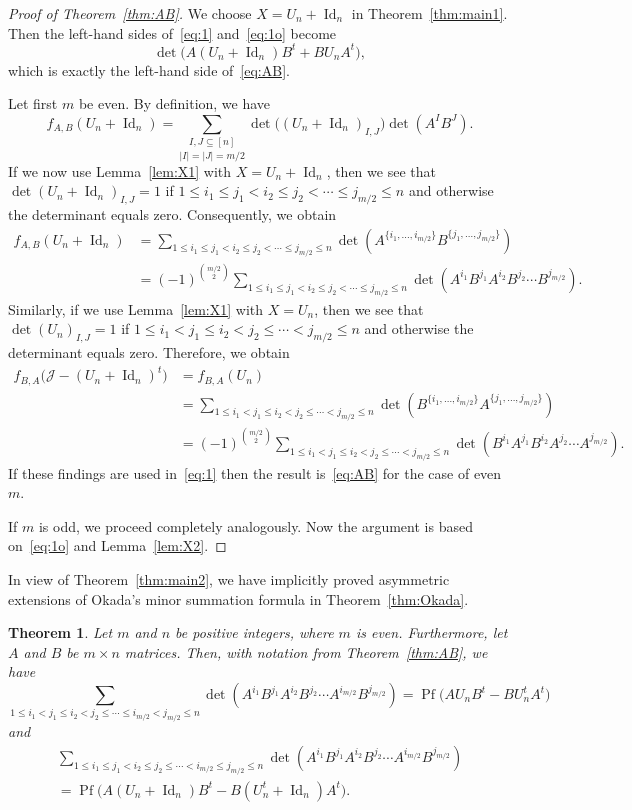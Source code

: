 \documentclass[12pt,reqno]{amsart}
\numberwithin{equation}{section}
\newtheorem{theorem}{Theorem}
\theoremstyle{definition}
\theoremstyle{remark}
\def\Pf{\operatorname{Pf}}
\def\Id{\operatorname{Id}}
\def\J{\mathcal J}
\begin{document}
\begin{proof}[Proof of Theorem~\ref{thm:AB}]
We choose $X=U_n+\Id_n$ in Theorem~\ref{thm:main1}.
Then the left-hand sides of~\eqref{eq:1} and~\eqref{eq:1o} become
$$
\det\bigl(A(U_n+\Id_n)B^t+BU_nA^t\bigr),
$$
which is exactly the left-hand side of~\eqref{eq:AB}.

Let first $m$ be even.
By definition, we have
$$
f_{A,B}(U_n+\Id_n)=\underset {|I|=|J|=m/2}{\sum_{I,J\subseteq[n]}}
\det \bigl((U_n+\Id_n)_{I,J}\bigr) \det(A^IB^J).
$$
If we now use Lemma~\ref{lem:X1} with $X=U_n+\Id_n$, then we
see that $\det (U_n+\Id_n)_{I,J}=1$ if
$1\le i_1\le j_1<i_2\le j_2<\cdots\le j_{m/2}\le n$ and otherwise
the determinant equals zero.
Consequently, we obtain
\begin{align*}
f_{A,B}(U_n+\Id_n)
&={\sum_{1\le i_1\le j_1<i_2\le j_2<\cdots\le j_{m/2}\le n}}
\det(A^{\{i_1,\dots,i_{m/2}\}}B^{\{j_1,\dots,j_{m/2}\}})\\
&=(-1)^{\binom {m/2}2}
{\sum_{1\le i_1\le j_1<i_2\le j_2<\cdots\le j_{m/2}\le n}}
\det(A^{i_1}B^{j_1}A^{i_2}B^{j_2}\cdots B^{j_{m/2}}).
\end{align*}
Similarly, if we use Lemma~\ref{lem:X1} with $X=U_n$, then we
see that $\det (U_n)_{I,J}=1$ if
$1\le i_1< j_1\le i_2< j_2\le\cdots< j_{m/2}\le n$ and  otherwise
the determinant equals zero.
Therefore, we obtain
\begin{align*}
f_{B,A}\bigl(\J -(U_n+\Id_n)^t\bigr)&=f_{B,A}(U_n)\\
&={\sum_{1\le i_1< j_1\le i_2< j_2\le\cdots< j_{m/2}\le n}}
\det(B^{\{i_1,\dots,i_{m/2}\}}A^{\{j_1,\dots,j_{m/2}\}})\\
&=(-1)^{\binom {m/2}2}
{\sum_{1\le i_1< j_1\le i_2< j_2\le\cdots< j_{m/2}\le n}}
\det(B^{i_1}A^{j_1}B^{i_2}A^{j_2}\cdots A^{j_{m/2}}).
\end{align*}
If these findings are used in~\eqref{eq:1} then the result
is~\eqref{eq:AB} for the case of even~$m$.

\medskip
If $m$ is odd, we proceed completely analogously. Now the argument is
based on~\eqref{eq:1o} and Lemma~\ref{lem:X2}.
\end{proof}

In view of Theorem~\ref{thm:main2}, we have implicitly proved 
asymmetric extensions of Okada's minor summation formula in
Theorem~\ref{thm:Okada}. 

\begin{theorem} \label{thm:AB2}
Let $m$ and $n$ be positive integers, where $m$ is even.
Furthermore, let $A$ and $B$ be $m\times n$ matrices.
Then, with notation from Theorem~\ref{thm:AB}, we have
\begin{equation} \label{eq:AB22}
\sum_{1\le i_1< j_1\le i_2< j_2\le\cdots\le i_{m/2}<j_{m/2}\le n}
\det(A^{i_1}B^{j_1}A^{i_2}B^{j_2}\cdots A^{i_{m/2}}B^{j_{m/2}})
=\Pf\bigl(AU_nB^t-BU_n^tA^t\bigr)
\end{equation}
and
\begin{multline} \label{eq:AB23}
\sum_{1\le i_1\le j_1< i_2\le j_2\le\cdots<i_{m/2}\le j_{m/2}\le n}
\det(A^{i_1}B^{j_1}A^{i_2}B^{j_2}\cdots A^{i_{m/2}}B^{j_{m/2}})
\\
=\Pf\bigl(A(U_n+\Id_n)B^t-B(U_n^t+\Id_n)A^t\bigr).
\end{multline}
\end{theorem}
\end{document}
